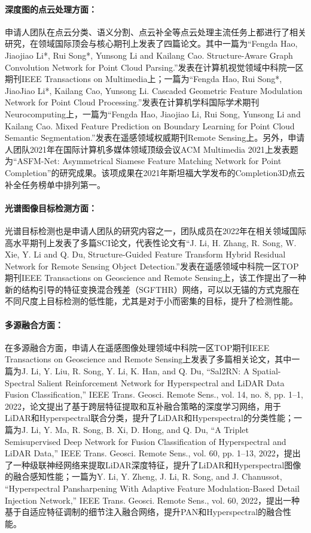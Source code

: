 \documentclass[12pt]{article}
\newcommand{\myPara}[1]{\paragraph{#1：}}
\begin{document}
\myPara{深度图的点云处理方面}
申请人团队在点云分类、语义分割、点云补全等点云处理主流任务上都进行了相关研究，在领域国际顶会与核心期刊上发表了四篇论文。其中一篇为“Fengda Hao, Jiaojiao Li*, Rui Song*, Yunsong Li and Kailang Cao. Structure-Aware Graph Convolution Network for Point Cloud Parsing.”发表在计算机视觉领域中科院一区期刊IEEE Transactions on Multimedia上；一篇为“Fengda Hao, Rui Song*, JiaoJiao Li*, Kailang Cao, Yunsong Li. Cascaded Geometric Feature Modulation Network for Point Cloud Processing.”发表在计算机学科国际学术期刊Neurocomputing上，一篇为“Fengda Hao, Jiaojiao Li, Rui Song, Yunsong Li and Kailang Cao. Mixed Feature Prediction on Boundary Learning for Point Cloud Semantic Segmentation.”发表在遥感领域权威期刊Remote Sensing上。另外，申请人团队2021年在国际计算机多媒体领域顶级会议ACM Multimedia 2021上发表题为“ASFM-Net: Asymmetrical Siamese Feature Matching Network for Point Completion”的研究成果。该项成果在2021年斯坦福大学发布的Completion3D点云补全任务榜单中排列第一。

\myPara{光谱图像目标检测方面}
光谱目标检测也是申请人团队的研究内容之一，团队成员在2022年在相关领域国际高水平期刊上发表了多篇SCI论文，代表性论文有“J. Li, H. Zhang, R. Song, W. Xie, Y. Li and Q. Du, Structure-Guided Feature Transform Hybrid Residual Network for Remote Sensing Object Detection.”发表在遥感领域中科院一区TOP期刊IEEE Transactions on Geoscience and Remote Sensing上，该工作提出了一种新的结构引导的特征变换混合残差（SGFTHR）网络，可以以无锚的方式克服在不同尺度上目标检测的低性能，尤其是对于小而密集的目标，提升了检测性能。

\myPara{多源融合方面}
在多源融合方面，申请人在遥感图像处理领域中科院一区TOP期刊IEEE Transactions on Geoscience and Remote Sensing上发表了多篇相关论文，其中一篇为J. Li, Y. Liu, R. Song, Y. Li, K. Han, and Q. Du, “Sal2RN: A Spatial-Spectral Salient Reinforcement Network for Hyperspectral and LiDAR Data Fusion Classification,” IEEE Trans. Geosci. Remote Sens., vol. 14, no. 8, pp. 1–1, 2022，论文提出了基于跨层特征提取和互补融合策略的深度学习网络，用于LiDAR和Hyperspectral联合分类，提升了LiDAR和Hyperspectral的分类性能；一篇为J. Li, Y. Ma, R. Song, B. Xi, D. Hong, and Q. Du, “A Triplet Semisupervised Deep Network for Fusion Classification of Hyperspectral and LiDAR Data,” IEEE Trans. Geosci. Remote Sens., vol. 60, pp. 1–13, 2022，提出了一种级联神经网络来提取LiDAR深度特征，提升了LiDAR和Hyperspectral图像的融合感知性能；一篇为Y. Li, Y. Zheng, J. Li, R. Song, and J. Chanussot, “Hyperspectral Pansharpening With Adaptive Feature Modulation-Based Detail Injection Network,” IEEE Trans. Geosci. Remote Sens., vol. 60, 2022，提出一种基于自适应特征调制的细节注入融合网络，提升PAN和Hyperspectral的融合性能。
\end{document}
